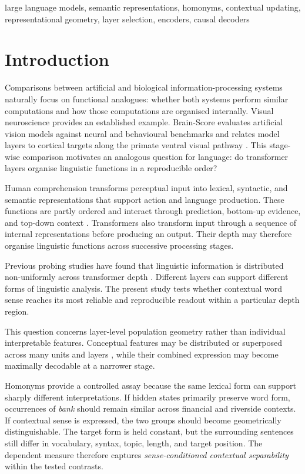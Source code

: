 \documentclass[conference]{IEEEtran}
\begin{document}
\begin{IEEEkeywords}
large language models, semantic representations, homonyms, contextual
updating, representational geometry, layer selection, encoders, causal decoders
\end{IEEEkeywords}

\section{Introduction}

Comparisons between artificial and biological information-processing systems
naturally focus on functional analogues: whether both systems perform similar
computations and how those computations are organised internally. Visual
neuroscience provides an established example. Brain-Score evaluates artificial
vision models against neural and behavioural benchmarks and relates model
layers to cortical targets along the primate ventral visual pathway
\citep{schrimpf2020brainscore}. This stage-wise comparison motivates an
analogous question for language: do transformer layers organise linguistic
functions in a reproducible order?

Human comprehension transforms perceptual input into lexical, syntactic, and
semantic representations that support action and language production. These
functions are partly ordered and interact through prediction, bottom-up
evidence, and top-down context \citep{ryskin2023}. Transformers also transform
input through a sequence of internal representations before producing an
output. Their depth may therefore organise linguistic functions across
successive processing stages.

Previous probing studies have found that linguistic information is distributed
non-uniformly across transformer depth \citep{tenney2019}. Different layers can
support different forms of linguistic analysis. The present study tests whether
contextual word sense reaches its most reliable and reproducible readout within
a particular depth region.

This question concerns layer-level population geometry rather than individual
interpretable features. Conceptual features may be distributed or superposed
across many units and layers \citep{elhage2022,bricken2023,templeton2024}, while
their combined expression may become maximally decodable at a narrower stage.

Homonyms provide a controlled assay because the same lexical form can support
sharply different interpretations. If hidden states primarily preserve word
form, occurrences of \emph{bank} should remain similar across financial and
riverside contexts. If contextual sense is expressed, the two groups should
become geometrically distinguishable. The target form is held constant, but
the surrounding sentences still differ in vocabulary, syntax, topic, length,
and target position. The dependent measure therefore captures
\emph{sense-conditioned contextual separability} within the tested contrasts.
\end{document}
